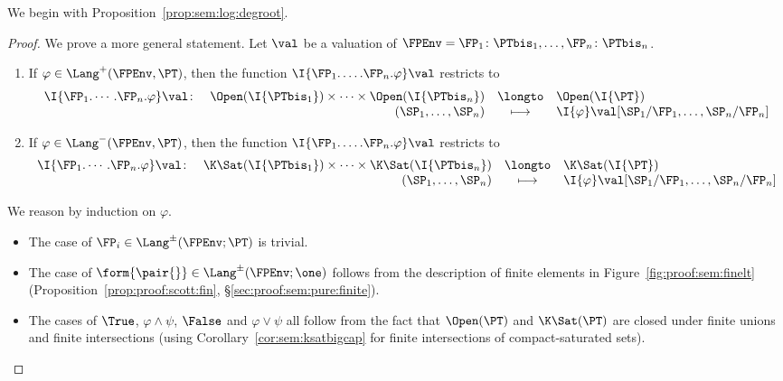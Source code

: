 We begin with Proposition~\ref{prop:sem:log:degroot}.

\PropFormdeGroot*

\begin{proof}
We prove a more general statement.
Let $\val$ be a valuation of
$\FPEnv = \FP_1\colon \PTbis_1, \dots, \FP_n\colon \PTbis_n$.
\begin{enumerate}[(1)]
\item
If $\varphi \in \Lang^+(\FPEnv,\PT)$,
then the function $\I{\FP_1.\dots.\FP_n.\varphi}\val$
restricts to
\[
\begin{array}{l r c l}
  \I{\FP_1.\cdots.\FP_n.\varphi}\val \colon
& \Open(\I{\PTbis_1}) \times \dots \times \Open(\I{\PTbis_n})
& \longto
& \Open(\I{\PT})
\\
%
& (\SP_1,\dots,\SP_n)
& \longmapsto
& \I{\varphi}\val[\SP_1 / \FP_1, \dots, \SP_n / \FP_n]
\end{array}
\]

\item
If $\varphi \in \Lang^-(\FPEnv,\PT)$,
then the function $\I{\FP_1.\dots.\FP_n.\varphi}\val$
restricts to
\[
\begin{array}{l r c l}
  \I{\FP_1.\cdots.\FP_n.\varphi}\val \colon
& \K\Sat(\I{\PTbis_1}) \times \dots \times \K\Sat(\I{\PTbis_n})
& \longto
& \K\Sat(\I{\PT})
\\
%
& (\SP_1,\dots,\SP_n)
& \longmapsto
& \I{\varphi}\val[\SP_1 / \FP_1, \dots, \SP_n / \FP_n]
\end{array}
\]
\end{enumerate}

We reason by induction on $\varphi$.
\begin{itemize}
\item
The case of $\FP_i \in \Lang^\pm(\FPEnv;\PT)$ is trivial.

\item
The case of $\form{\pair{}} \in \Lang^\pm(\FPEnv;\one)$
follows from the description of finite elements
in Figure~\ref{fig:proof:sem:finelt}
(Proposition~\ref{prop:proof:scott:fin}, \S\ref{sec:proof:sem:pure:finite}).

\item
The cases of $\True$, $\varphi \land \psi$, $\False$ and $\varphi \lor \psi$
all follow from the fact that $\Open(\PT)$ and $\K\Sat(\PT)$
are closed under finite unions and finite intersections
(using Corollary~\ref{cor:sem:ksatbigcap}
for finite intersections of compact-saturated sets).


\end{itemize}
\end{proof}
